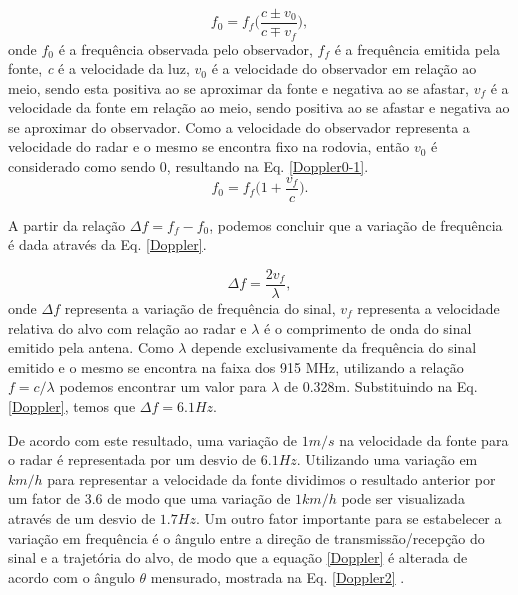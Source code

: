\begin{equation}\label{Doppler0} 
  f_0 = f_f \Big(\frac{c \pm v_0}{c \mp v_f} \Big),
\end{equation} onde $f_0$ é a frequência observada pelo observador, $f_f$ é a frequência emitida pela fonte, \emph{c} é a velocidade da luz, $v_0$ é a velocidade do observador em relação ao meio, sendo esta positiva ao se aproximar da fonte e negativa ao se afastar, $v_f$ é a velocidade da fonte em relação ao meio, sendo positiva ao se afastar e negativa ao se aproximar do observador.
Como a velocidade do observador representa a velocidade do radar e o mesmo se encontra fixo na rodovia, então $v_0$ é considerado como sendo 0, resultando na Eq. \ref{Doppler0-1}.
\begin{equation}\label{Doppler0-1} 
  f_0 = f_f \Big(1 + \frac{v_f}{c} \Big).
\end{equation}

A partir da relação $\Delta f = f_{f} - f_{0}$, podemos concluir que a variação de frequência é dada através da Eq. \ref{Doppler}.

\begin{equation}\label{Doppler} 
  \Delta f =  \frac{2v_f}{\lambda},
\end{equation} onde $\Delta f$ representa a variação de frequência do sinal, $v_f$ representa a velocidade relativa do alvo com relação ao radar e $\lambda$ é o comprimento de onda do sinal emitido pela antena. Como $\lambda$ depende exclusivamente da frequência do sinal emitido e o mesmo se encontra na faixa dos 915 MHz, utilizando a relação $f=c/\lambda$  podemos encontrar um valor para $\lambda$ de 0.328m. Substituindo na Eq. \ref{Doppler}, temos que $\Delta f = 6.1 Hz$.

De acordo com este resultado, uma variação de $1 m/s$ na velocidade da fonte para o radar é representada por um desvio de $6.1 Hz$. Utilizando uma variação em $km/h$ para representar a velocidade da fonte dividimos o resultado anterior por um fator de 3.6 de modo que uma variação de $1km/h$ pode ser visualizada através de um desvio de $1.7 Hz$.
Um outro fator importante para se estabelecer a variação em frequência é o ângulo entre a direção de transmissão/recepção do sinal e a trajetória do alvo, de modo que a equação \ref{Doppler} é alterada de acordo com o ângulo $\theta$ mensurado, mostrada na Eq. \ref{Doppler2} \cite{Radar}.

